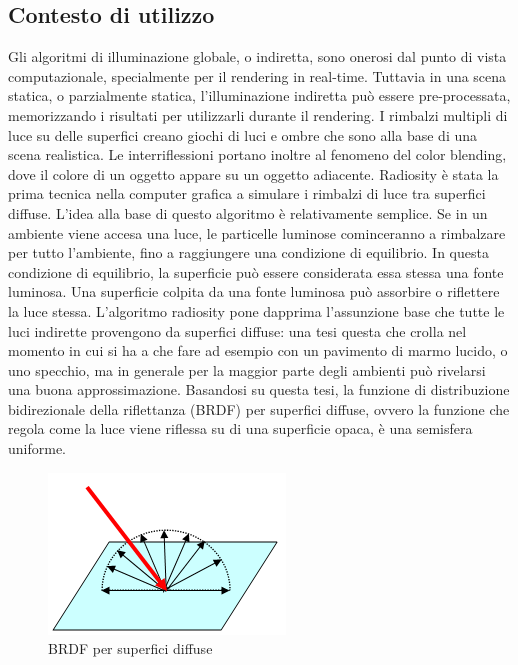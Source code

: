 \subsection{Contesto di utilizzo}
\label{sec:chapter_stato_arte_contex_use}

Gli algoritmi di illuminazione globale, o indiretta, sono onerosi dal punto di vista computazionale, specialmente per il rendering in real-time. 
Tuttavia in una scena statica, o parzialmente statica, l’illuminazione indiretta può essere pre-processata, memorizzando i risultati per utilizzarli durante il rendering. 
I rimbalzi multipli di luce su delle superfici creano giochi di luci e ombre che sono alla base di una scena realistica. Le interriflessioni portano inoltre al fenomeno del color blending, dove il colore di un oggetto appare su un oggetto adiacente. 
Radiosity è stata la prima tecnica nella computer grafica a simulare i rimbalzi di luce tra superfici diffuse. 
L’idea alla base di questo algoritmo è relativamente semplice. Se in un ambiente viene accesa una luce, le particelle luminose cominceranno a rimbalzare per tutto l’ambiente, fino a raggiungere una condizione di equilibrio. In questa condizione di equilibrio, la superficie può essere considerata essa stessa una fonte luminosa. 
Una superficie colpita da una fonte luminosa può assorbire o riflettere la luce stessa. L’algoritmo radiosity pone dapprima l’assunzione base che tutte le luci indirette provengono da superfici diffuse: una tesi questa che crolla nel momento in cui si ha a che fare ad esempio con un pavimento di marmo lucido, o uno specchio, ma in generale per la maggior parte degli ambienti può rivelarsi una buona approssimazione. Basandosi su questa tesi, la funzione di distribuzione bidirezionale della riflettanza (BRDF) per superfici diffuse, ovvero la funzione che regola come la luce viene riflessa su di una superficie opaca, è una semisfera uniforme.
\\
\begin{figure}[htb]
 \centering
 \includegraphics[width=0.5\linewidth]{images/chapter_stato_arte/stato_attuale_brdf_semistefa.png}\hfill
 \caption[BRDF superfici diffuse]{BRDF per superfici diffuse}
 \label{fig:stato_attuale_brdf_semistefa}
\end{figure}
